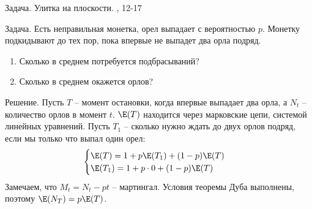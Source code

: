 Задача. Улитка на плоскости.  \cite{stirzaker:otep}, 12-17








Задача. Есть неправильная монетка, орел выпадает с вероятностью $p$. Монетку подкидывают до тех пор, пока впервые не выпадет два орла подряд. 
\begin{enumerate}
\item Сколько в среднем потребуется подбрасываний?
\item Сколько в среднем окажется орлов?
\end{enumerate}

Решение. Пусть $T$ -- момент остановки, когда впервые выпадает два орла, а $N_{t}$ -- количество орлов в момент $t$. $\E(T)$ находится через марковские цепи, системой линейных уравнений. Пусть $T_{1}$ -- сколько нужно ждать до двух орлов подряд, если мы только что выпал один орел:
\begin{equation}
\begin{cases}
\E(T)=1+p\E(T_{1})+(1-p)\E(T)\\
\E(T_{1})=1+p\cdot 0+(1-p)\E(T)
\end{cases}
\end{equation}
Замечаем, что $M_{t}=N_{t}-pt$ -- мартингал. Условия теоремы Дуба выполнены, поэтому $\E(N_{T})=p\E(T)$.



% 




